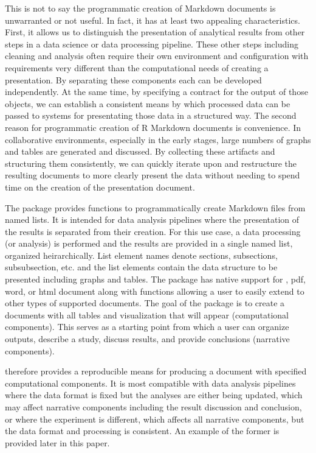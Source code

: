 \documentclass[
]{jss}
\begin{document}
This is not to say the programmatic creation of  Markdown
documents is unwarranted or not useful. In fact, it has at least two
appealing characteristics. First, it allows us to distinguish the
presentation of analytical results from other steps in a data science or
data processing pipeline. These other steps including cleaning and
analysis often require their own environment and configuration with
requirements very different than the computational needs of creating a
presentation. By separating these components each can be developed
independently. At the same time, by specifying a contract for the output
of those objects, we can establish a consistent means by which processed
data can be passed to systems for presentating those data in a
structured way. The second reason for programmatic creation of R
Markdown documents is convenience. In collaborative environments,
especially in the early stages, large numbers of graphs and tables are
generated and discussed. By collecting these artifacts and structuring
them consistently, we can quickly iterate upon and restructure the
resulting documents to more clearly present the data without needing to
spend time on the creation of the presentation document.

The  package provides functions to programmatically create
 Markdown files from named lists. It is intended for data
analysis pipelines where the presentation of the results is separated
from their creation. For this use case, a data processing (or analysis)
is performed and the results are provided in a single named list,
organized heirarchically. List element names denote sections,
subsections, subsubsection, etc. and the list elements contain the data
structure to be presented including graphs and tables. The package has
native support for  \citep{blischak2019}, pdf, word, or
html document along with functions allowing a user to easily extend to
other types of supported documents. The goal of the package is to create
a documents with all tables and visualization that will appear
(computational components). This serves as a starting point from which a
user can organize outputs, describe a study, discuss results, and
provide conclusions (narrative components).

 therefore provides a reproducible means for producing a
document with specified computational components. It is most compatible
with data analysis pipelines where the data format is fixed but the
analyses are either being updated, which may affect narrative components
including the result discussion and conclusion, or where the experiment
is different, which affects all narrative components, but the data
format and processing is consistent. An example of the former is
provided later in this paper.
\end{document}
